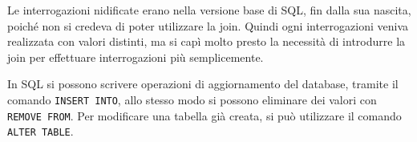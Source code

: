 \documentclass{article}
\numberwithin{equation}{subsection}
\begin{document}
Le interrogazioni nidificate erano nella versione base di SQL, fin dalla sua nascita, poiché non si credeva di poter utilizzare la join. Quindi ogni interrogazioni 
veniva realizzata con valori distinti, ma si capì molto presto la necessità di introdurre la join per effettuare interrogazioni più semplicemente. 


In SQL si possono scrivere operazioni di aggiornamento del database, tramite il comando \verb|INSERT INTO|, allo stesso modo si possono eliminare dei valori con 
\verb|REMOVE FROM|. Per modificare una tabella già creata, si può utilizzare il comando \verb|ALTER TABLE|. 
\end{document}
